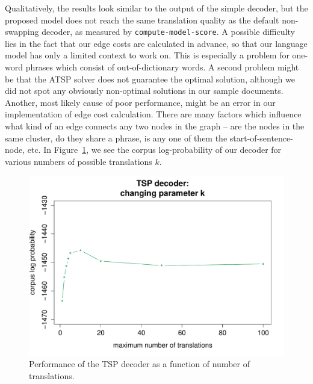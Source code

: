 Qualitatively, the results look similar to the output of the simple decoder,
but the proposed model does not reach the same translation quality as the
default non-swapping decoder, as measured by \texttt{compute-model-score}.
A possible difficulty lies in the fact that our edge costs are calculated in
advance, so that our language model has only a limited context to work on.
This is especially a problem for one-word phrases which consist of
out-of-dictionary words. A second problem might be that the \textsc{ATSP}
solver does not guarantee the optimal solution, although we did not spot any
obviously non-optimal solutions in our sample documents.
Another, most likely cause of poor performance, might be an error in our implementation 
of edge cost calculation. There are many factors which influence what kind of an edge connects 
any two nodes in the graph -- are the nodes in the same cluster, do they share a phrase, is any 
one of them the start-of-sentence-node, etc.
In Figure~\ref{decode3}, we see the corpus log-probability of our decoder for
various numbers of possible translations $k$.

\begin{figure}
	\centering
	\includegraphics[scale=.5]{figures/TSP_k.pdf}
	\caption{Performance of the TSP decoder as a function of number of translations.}\label{decode3}
\end{figure}
